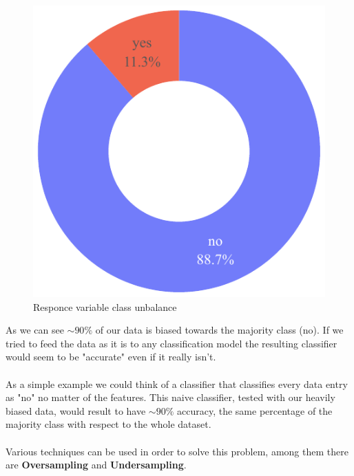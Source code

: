 \begin{figure}[H]
    \centering
    \includegraphics[scale=0.8]{pictures/pieplot_unbalance.pdf}

    \caption{Responce variable class unbalance}
\end{figure}

As we can see $\sim 90\%$ of our data is biased towards the majority class (no). If we tried to feed the data as it is to any classification model the resulting classifier would seem to be "accurate" even if it really isn't.\\
\\
As a simple example we could think of a classifier that classifies every data entry as "no" no matter of the features. This naive classifier, tested with our heavily biased data, would result to have $\sim 90\%$ accuracy, the same percentage of the majority class with respect to the whole dataset.\\
\\
Various techniques can be used in order to solve this problem, among them there are \textbf{Oversampling} and \textbf{Undersampling}. 

